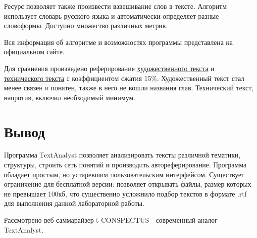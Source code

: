 	Ресурс позволяет также произвести взвешивание слов в тексте.
	Алгоритм использует словарь русского языка и автоматически определяет разные словоформы.
	Доступно множество различных метрик.
	
	Вся информация об алгоритме и возможностях программы представлена на официальном сайте.
	
	Для сравнения произведено реферирование  \href{./listings/chipollino-conspectus.txt}{художественного текста} и \href{./listings/lab-3-conspectus.txt}{технического текста} с коэффициентом сжатия 15\%. 
	Художественный текст стал менее связен и понятен, также в него не вошли названия глав.
	Технический текст, напротив, включил необходимый минимум.
	
	\section{Вывод}
	Программа TextAnalyst позволяет анализировать тексты различной тематики, структуры, строить сеть понятий и производить автореферирование. 
	Программа обладает простым, но устаревшим пользовательским интерфейсом. 
	Существует ограничение для бесплатной версии: позволяет открывать файлы, размер которых не превышает 100кб, что существенно усложнило подбор текстов в формате .rtf для выполнения данной лабораторной работы. 
	
	Рассмотрено веб-саммарайзер t-CONSPECTUS - современный аналог TextAnalyst.
	